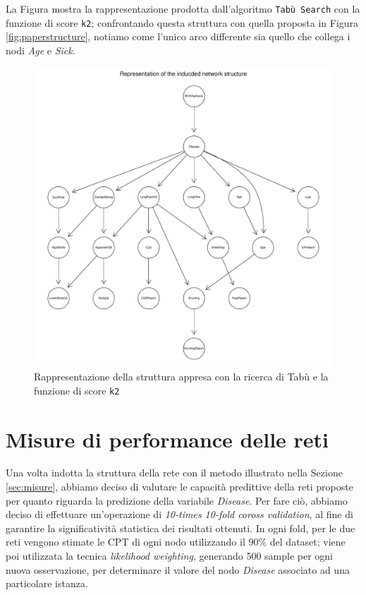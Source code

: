 La Figura mostra la rappresentazione prodotta dall'algoritmo \texttt{Tabù Search} con la funzione di score \texttt{k2}; confrontando questa struttura con quella proposta in Figura \ref{fig:paperstructure}, notiamo come l'unico arco differente sia quello che collega i nodi \textit{Age} e \textit{Sick}.

\begin{figure}
	\centering
	\includegraphics[width=.9\linewidth]{images/induced_structure}
	\caption{Rappresentazione della struttura appresa con la ricerca di Tabù e la funzione di score \texttt{k2}}
	\label{fig:inducedstructure}
\end{figure}

\newpage
\section{Misure di performance delle reti}
\label{sec:performance}
Una volta indotta la struttura della rete con il metodo illustrato nella Sezione \ref{sec:misure}, abbiamo deciso di valutare le capacità predittive della reti proposte per quanto riguarda la predizione della variabile \textit{Disease}. Per fare ciò, abbiamo deciso di effettuare un'operazione di \textit{10-times 10-fold coross validation}, al fine di garantire la significatività statistica dei risultati ottenuti. In ogni fold, per le due reti vengono stimate le CPT di ogni nodo utilizzando il $90\%$ del dataset; viene poi utilizzata la tecnica \textit{likelihood weighting}, generando 500 sample per ogni nuova osservazione, per determinare il valore del nodo \textit{Disease} associato ad una particolare istanza.

